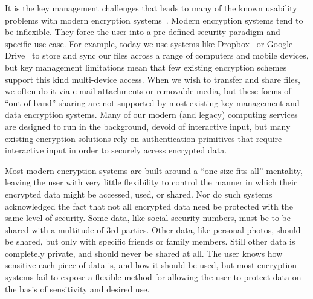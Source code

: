 It is the key management challenges that leads to many of the known
usability problems with modern encryption systems~\cite{Whitten1999,
  Sweikata2009, Kher2005}. Modern encryption systems tend to be
inflexible. They force the user into a pre-defined security paradigm
and specific use case. For example, today we use systems like
Dropbox~\cite{dropbox} or Google Drive~\cite{google-drive} to store
and sync our files across a range of computers and mobile devices, but
key management limitations mean that few existing encryption schemes
support this kind multi-device access. When we wish to transfer and
share files, we often do it via e-mail attachments or removable media,
but these forms of ``out-of-band'' sharing are not supported by most
existing key management and data encryption systems. Many of our
modern (and legacy) computing services are designed to run in the
background, devoid of interactive input, but many existing encryption
solutions rely on authentication primitives that require interactive
input in order to securely access encrypted data.

Most modern encryption systems are built around a ``one size fits
all'' mentality, leaving the user with very little flexibility to
control the manner in which their encrypted data might be accessed,
used, or shared. Nor do such systems acknowledged the fact that not
all encrypted data need be protected with the same level of
security. Some data, like social security numbers, must be to be
shared with a multitude of 3rd parties. Other data, like personal
photos, should be shared, but only with specific friends or family
members. Still other data is completely private, and should never be
shared at all. The user knows how sensitive each piece of data is, and
how it should be used, but most encryption systems fail to expose a
flexible method for allowing the user to protect data on the basis of
sensitivity and desired use.

